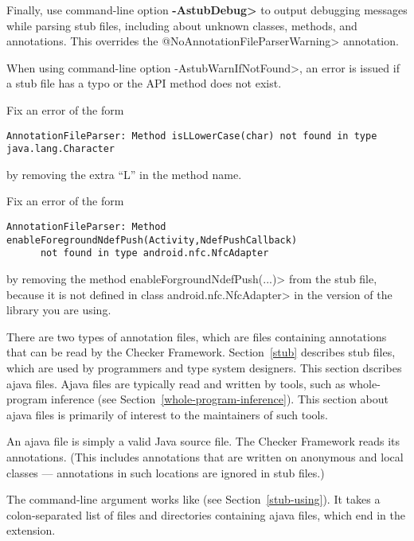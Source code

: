 Finally,
use command-line option {\bf\<-AstubDebug>} to output debugging messages while
parsing stub files, including about unknown classes, methods, and
annotations.  This overrides the \<@NoAnnotationFileParserWarning> annotation.




When using command-line option \<-AstubWarnIfNotFound>,
an error is issued if a stub file has a typo or the API method does not
exist.

Fix an error of the form
\begin{Verbatim}
AnnotationFileParser: Method isLLowerCase(char) not found in type java.lang.Character
\end{Verbatim}

\noindent
by removing the extra ``L'' in the method name.

Fix an error of the form
\begin{Verbatim}
AnnotationFileParser: Method enableForegroundNdefPush(Activity,NdefPushCallback)
      not found in type android.nfc.NfcAdapter
\end{Verbatim}

\noindent
by removing the method \<enableForgroundNdefPush(...)> from
the stub file, because it is not defined in class \<android.nfc.NfcAdapter>
in the version of the library you are using.



There are two types of annotation files, which are files containing annotations that
can be read by the Checker Framework.
Section~\ref{stub} describes stub files, which are used by programmers and
type system designers.
This section dscribes ajava files.
Ajava files are typically read and written by tools, such as whole-program
inference (see Section~\ref{whole-program-inference}).  This section about
ajava files is primarily of interest to the maintainers of such tools.

An ajava file is simply a valid Java source file.
The Checker Framework reads its annotations.
(This includes annotations that are written
on anonymous and local classes --- annotations in such locations are ignored
in stub files.)



The  command-line argument works like  (see
Section~\ref{stub-using}). It takes a colon-separated list of
files and directories containing ajava files, which end in the 
extension.

